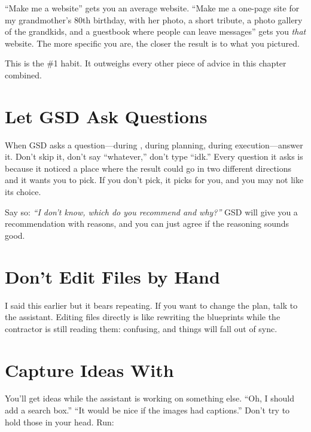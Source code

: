 \documentclass[11pt,letterpaper,openany]{book}
\begin{document}
``Make me a website'' gets you an average website. ``Make me a
one-page site for my grandmother's 80th birthday, with her photo,
a short tribute, a photo gallery of the grandkids, and a guestbook
where people can leave messages'' gets you \emph{that} website. The
more specific you are, the closer the result is to what you pictured.

This is the \#1 habit. It outweighs every other piece of advice in
this chapter combined.

\section{Let GSD Ask Questions}

\begin{sloppypar}
When GSD asks a question---during , during
planning, during execution---answer it. Don't skip it, don't say
``whatever,'' don't type ``idk.'' Every question it asks is because
it noticed a place where the result could go in two different
directions and it wants you to pick. If you don't pick, it picks
for you, and you may not like its choice.
\end{sloppypar}

\begin{gsdtip}
Say so: \emph{``I don't know, which do you recommend and why?''} GSD
will give you a recommendation with reasons, and you can just agree
if the reasoning sounds good.
\end{gsdtip}

\section{Don't Edit  Files by Hand}

I said this earlier but it bears repeating. If you want to change
the plan, talk to the assistant. Editing  files
directly is like rewriting the blueprints while the contractor is
still reading them: confusing, and things will fall out of sync.

\section{Capture Ideas With \texorpdfstring{}{/gsd-add-todo}}

You'll get ideas while the assistant is working on something else.
``Oh, I should add a search box.'' ``It would be nice if the images
had captions.'' Don't try to hold those in your head. Run:
\end{document}

